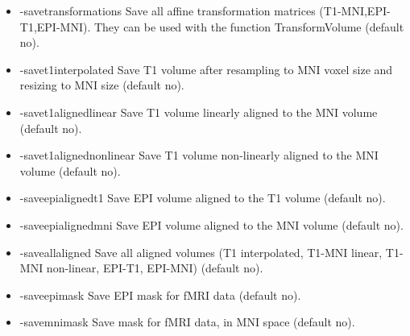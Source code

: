 \begin{itemize}

\item -savetransformations
\newline \newline Save all affine transformation matrices (T1-MNI,EPI-T1,EPI-MNI). They can be used with the function TransformVolume (default no).

\item -savet1interpolated        
\newline \newline Save T1 volume after resampling to MNI voxel size and resizing to MNI size (default no). 

\item -savet1alignedlinear       
\newline \newline Save T1 volume linearly aligned to the MNI volume (default no). 

\item -savet1alignednonlinear    
\newline \newline Save T1 volume non-linearly aligned to the MNI volume (default no). 

\item -saveepialignedt1          
\newline \newline Save EPI volume aligned to the T1 volume (default no). 

\item -saveepialignedmni         
\newline \newline Save EPI volume aligned to the MNI volume (default no). 

\item -saveallaligned            
\newline \newline Save all aligned volumes (T1 interpolated, T1-MNI linear, T1-MNI non-linear, EPI-T1, EPI-MNI) (default no). 

\item -saveepimask               
\newline \newline Save EPI mask for fMRI data  (default no). 

\item -savemnimask               
\newline \newline Save mask for fMRI data, in MNI space  (default no). 


\end{itemize}
